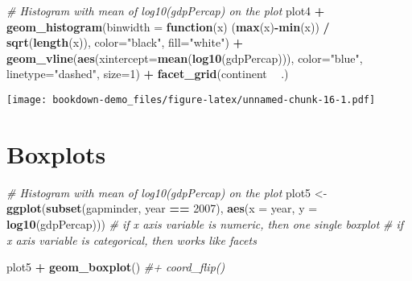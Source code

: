 \documentclass[
]{book}
\newenvironment{Shaded}{\begin{snugshade}}{\end{snugshade}}
\newcommand{\CommentTok}[1]{\textcolor[rgb]{0.56,0.35,0.01}{\textit{#1}}}
\newcommand{\ControlFlowTok}[1]{\textcolor[rgb]{0.13,0.29,0.53}{\textbf{#1}}}
\newcommand{\DataTypeTok}[1]{\textcolor[rgb]{0.13,0.29,0.53}{#1}}
\newcommand{\DecValTok}[1]{\textcolor[rgb]{0.00,0.00,0.81}{#1}}
\newcommand{\KeywordTok}[1]{\textcolor[rgb]{0.13,0.29,0.53}{\textbf{#1}}}
\newcommand{\NormalTok}[1]{#1}
\newcommand{\OperatorTok}[1]{\textcolor[rgb]{0.81,0.36,0.00}{\textbf{#1}}}
\newcommand{\StringTok}[1]{\textcolor[rgb]{0.31,0.60,0.02}{#1}}
\begin{document}
\begin{Shaded}
\begin{Highlighting}[]
\CommentTok{# Histogram with mean of log10(gdpPercap) on the plot}
\NormalTok{plot4 }\OperatorTok{+}\StringTok{ }
\StringTok{  }\KeywordTok{geom_histogram}\NormalTok{(}\DataTypeTok{binwidth =} \ControlFlowTok{function}\NormalTok{(x) (}\KeywordTok{max}\NormalTok{(x)}\OperatorTok{-}\KeywordTok{min}\NormalTok{(x)) }\OperatorTok{/}\StringTok{ }\KeywordTok{sqrt}\NormalTok{(}\KeywordTok{length}\NormalTok{(x)), }\DataTypeTok{color=}\StringTok{"black"}\NormalTok{, }\DataTypeTok{fill=}\StringTok{"white"}\NormalTok{) }\OperatorTok{+}
\StringTok{  }\KeywordTok{geom_vline}\NormalTok{(}\KeywordTok{aes}\NormalTok{(}\DataTypeTok{xintercept=}\KeywordTok{mean}\NormalTok{(}\KeywordTok{log10}\NormalTok{(gdpPercap))),}
            \DataTypeTok{color=}\StringTok{"blue"}\NormalTok{, }\DataTypeTok{linetype=}\StringTok{"dashed"}\NormalTok{, }\DataTypeTok{size=}\DecValTok{1}\NormalTok{) }\OperatorTok{+}
\StringTok{  }\KeywordTok{facet_grid}\NormalTok{(continent }\OperatorTok{~}\StringTok{ }\NormalTok{.)}
\end{Highlighting}
\end{Shaded}

\texttt{[image: bookdown-demo\_files/figure-latex/unnamed-chunk-16-1.pdf]}

\pagebreak

\hypertarget{boxplots}{%
\section{Boxplots}\label{boxplots}}

\begin{Shaded}
\begin{Highlighting}[]
\CommentTok{# Histogram with mean of log10(gdpPercap) on the plot}
\NormalTok{plot5 <-}\StringTok{ }\KeywordTok{ggplot}\NormalTok{(}\KeywordTok{subset}\NormalTok{(gapminder, year }\OperatorTok{==}\StringTok{ }\DecValTok{2007}\NormalTok{),}
                \KeywordTok{aes}\NormalTok{(}\DataTypeTok{x =}\NormalTok{ year, }\DataTypeTok{y =} \KeywordTok{log10}\NormalTok{(gdpPercap))) }
\CommentTok{# if x axis variable is numeric, then one single boxplot}
\CommentTok{# if x axis variable is categorical, then works like facets}

\NormalTok{plot5 }\OperatorTok{+}\StringTok{ }
\StringTok{  }\KeywordTok{geom_boxplot}\NormalTok{() }\CommentTok{#+ coord_flip()}
\end{Highlighting}
\end{Shaded}
\end{document}
